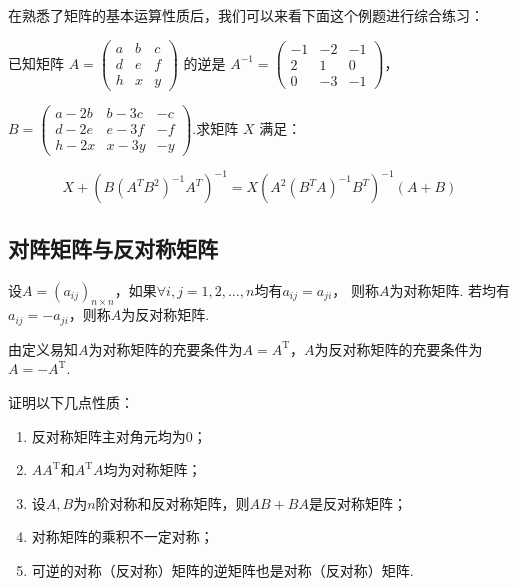 在熟悉了矩阵的基本运算性质后，我们可以来看下面这个例题进行综合练习：
\begin{example}
    已知矩阵 $A=\begin{pmatrix}a & b & c \\ d & e & f \\ h & x & y\end{pmatrix}$ 的逆是 $A^{-1}=\begin{pmatrix}-1 & -2 & -1 \\ 2 & 1 & 0 \\ 0 & -3 & -1\end{pmatrix}$，

$B=\begin{pmatrix}a-2b & b-3c & -c \\ d-2e & e-3f & -f \\ h-2x & x-3y & -y\end{pmatrix}$.求矩阵 $X$ 满足：

\[X+\left(B(A^TB^2)^{-1}A^T\right)^{-1}=X\left(A^2(B^TA)^{-1}B^T\right)^{-1}(A+B)\]
\end{example}
\begin{solution}

\end{solution}

\subsection{对阵矩阵与反对称矩阵}
\begin{definition}
    设$A=(a_{ij})_{n \times n}$，如果$\forall i,j=1,2,\ldots,n$均有$a_{ij}=a_{ji}$，
    则称$A$为对称矩阵. 若均有$a_{ij}=-a_{ji}$，则称$A$为反对称矩阵.
\end{definition}
由定义易知$A$为对称矩阵的充要条件为$A=A^\mathrm{T}$，$A$为反对称矩阵的充要条件为$A=-A^\mathrm{T}$.
\begin{example}
    证明以下几点性质：
    \begin{enumerate}
        \item 反对称矩阵主对角元均为0；

        \item $AA^\mathrm{T}$和$A^\mathrm{T}A$均为对称矩阵；

        \item 设$A,B$为$n$阶对称和反对称矩阵，则$AB+BA$是反对称矩阵；

        \item 对称矩阵的乘积不一定对称；

        \item 可逆的对称（反对称）矩阵的逆矩阵也是对称（反对称）矩阵.
    \end{enumerate}
\end{example}
\begin{solution}

\end{solution}

